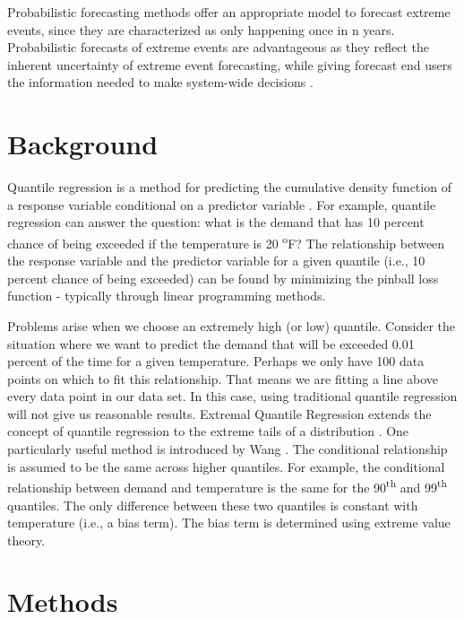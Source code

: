 \documentclass{article}
\begin{document}
Probabilistic forecasting methods offer an appropriate model to forecast extreme events, since they are characterized as only happening once in n years. Probabilistic forecasts of extreme events are advantageous as they reflect the inherent uncertainty of extreme event forecasting, while giving forecast end users the information needed to make system-wide decisions \cite{murphy1991probabilities}.


\section{Background}

Quantile regression is a method for predicting the cumulative density function of a response variable conditional on a predictor variable \cite{koenker1978regression}. For example, quantile regression can answer the question: what is the demand that has 10 percent chance of being exceeded if the temperature is 20 \textsuperscript{o}F? The relationship between the response variable and the predictor variable for a given quantile (i.e., 10 percent chance of being exceeded) can be found by minimizing the pinball loss function - typically through linear programming methods.

Problems arise when we choose an extremely high (or low) quantile. Consider the situation where we want to predict the demand that will be exceeded 0.01 percent of the time for a given temperature. Perhaps we only have 100 data points on which to fit this relationship. That means we are fitting a line above every data point in our data set. In this case, using traditional quantile regression will not give us reasonable results. Extremal Quantile Regression extends the concept of quantile regression to the extreme tails of a distribution \cite{chernozhukov2005extremal}. One particularly useful method is introduced by Wang \cite{wang2012estimation}. The conditional relationship is assumed to be the same across higher quantiles. For example, the conditional relationship between demand and temperature is the same for the 90\textsuperscript{th} and 99\textsuperscript{th} quantiles. The only difference between these two quantiles is constant with temperature (i.e., a bias term). The bias term is determined using extreme value theory.

\section{Methods}
\end{document}
